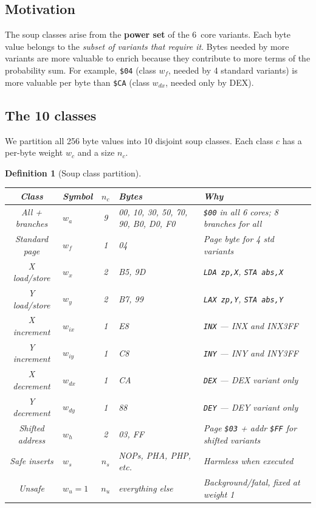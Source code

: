\documentclass{article}
\newcommand{\hex}[1]{\texttt{\$#1}}
\newcommand{\opcode}[1]{\texttt{#1}}
\newcommand{\wa}{w_a}
\newcommand{\wf}{w_f}
\newcommand{\wx}{w_x}
\newcommand{\wy}{w_y}
\newcommand{\wix}{w_{ix}}
\newcommand{\wiy}{w_{iy}}
\newcommand{\wdx}{w_{dx}}
\newcommand{\wdy}{w_{dy}}
\newcommand{\wh}{w_h}
\newcommand{\ws}{w_s}
\newcommand{\wu}{w_u}
\newtheorem{definition}{Definition}
\begin{document}
\subsection{Motivation}

The soup classes arise from the \textbf{power set} of the 6~core
variants.  Each byte value belongs to the \emph{subset of variants
that require it}.  Bytes needed by more variants are more valuable
to enrich because they contribute to more terms of the probability
sum.  For example, \hex{04} (class $\wf$, needed by 4 standard
variants) is more valuable per byte than \hex{CA} (class $\wdx$,
needed only by DEX).

\subsection{The 10 classes}

We partition all 256 byte values into 10 disjoint soup classes.
Each class $c$ has a per-byte weight $w_c$ and a size $n_c$.

\begin{definition}[Soup class partition]
\label{def:partition}
\begin{center}
\begin{tabular}{@{}clcll@{}}
\toprule
\textbf{Class} & \textbf{Symbol} & $n_c$ & \textbf{Bytes} & \textbf{Why} \\
\midrule
All + branches & $\wa$ & 9 & 00, 10, 30, 50, 70, 90, B0, D0, F0 &
  \hex{00} in all 6 cores; 8 branches for all \\
Standard page  & $\wf$ & 1 & 04 &
  Page byte for 4 std variants \\
X load/store   & $\wx$ & 2 & B5, 9D &
  \opcode{LDA zp,X}, \opcode{STA abs,X} \\
Y load/store   & $\wy$ & 2 & B7, 99 &
  \opcode{LAX zp,Y}, \opcode{STA abs,Y} \\
X increment    & $\wix$ & 1 & E8 &
  \opcode{INX} --- INX and INX3FF \\
Y increment    & $\wiy$ & 1 & C8 &
  \opcode{INY} --- INY and INY3FF \\
X decrement    & $\wdx$ & 1 & CA &
  \opcode{DEX} --- DEX variant only \\
Y decrement    & $\wdy$ & 1 & 88 &
  \opcode{DEY} --- DEY variant only \\
Shifted address & $\wh$ & 2 & 03, FF &
  Page \hex{03} + addr \hex{FF} for shifted variants \\
Safe inserts   & $\ws$ & $n_s$ & NOPs, PHA, PHP, etc. &
  Harmless when executed \\
Unsafe         & $\wu{=}1$ & $n_u$ & everything else &
  Background/fatal, fixed at weight 1 \\
\bottomrule
\end{tabular}
\end{center}
\end{definition}
\end{document}
